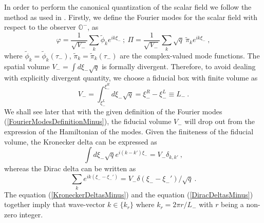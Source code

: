 \documentclass[aps,twocolumn,showpacs]{revtex4}
\def\observerminus{\mathbb{O}^{-}}
\begin{document}
In order to perform the canonical quantization of the scalar field we follow 
the method as used in \cite{Hossain:2010eb}. Firstly, we define the Fourier 
modes for the scalar field with respect to the observer $\observerminus$, as
%
\begin{equation}\label{FourierModesDefinitionMinus}
\varphi =  \frac{1}{\sqrt{V_{-}}}\sum_{k} \tilde{\phi}_{k} e^{i k \xi_{-}} ~;~
\Pi =  \frac{1}{\sqrt{V_{-}}} \sum_{k} \sqrt{q}~ \tilde{\pi}_{k} 
e^{i k \xi_{-}} ~,
\end{equation}
%
where $\tilde{\phi}_{k} = \tilde{\phi}_{k} (\tau_{-})$, 
$\tilde{\pi}_{k} = \tilde{\pi}_{k} (\tau_{-})$ are the complex-valued mode 
functions. The spatial volume $V_{-} = \int d\xi_{-}\sqrt{q}$ is formally 
divergent. Therefore, to avoid dealing with explicitly divergent quantity, we 
choose a fiducial box with finite volume as 
%
\begin{equation}\label{SpatialVoumeMinus}
V_{-} = \int_{\xi_{-}^L}^{\xi_{-}^R} d\xi_{-}\sqrt{q} = {\xi_{-}^R} - 
{\xi_{-}^L} \equiv L_{-} ~.
\end{equation}
%
We shall see later that with the given definition of the Fourier modes 
(\ref{FourierModesDefinitionMinus}), the fiducial volume $V_{-}$ will drop out 
from the expression of the Hamiltonian of the modes. Given the finiteness of 
the 
fiducial volume, the Kronecker delta can be expressed as
%
\begin{equation}\label{KroneckerDeltasMinus}
\int d\xi_{-}\sqrt{q}  e^{i(k-k')\xi_{-}} = V_{-} \delta_{k,k'} ~,
\end{equation}
%
whereas the Dirac delta can be written as
%
\begin{equation}\label{DiracDeltasMinus}
\sum_k e^{ik(\xi_{-}-\xi_{-}')} = V_{-} \delta(\xi_{-}-\xi_{-}')/\sqrt{q} ~.
\end{equation}
%
The equation (\ref{KroneckerDeltasMinus}) and the equation 
(\ref{DiracDeltasMinus}) together imply that wave-vector $k \in \{k_r\}$ 
where $k_r = 2\pi r/L_{-}$ with $r$ being a non-zero integer. 
\end{document}
